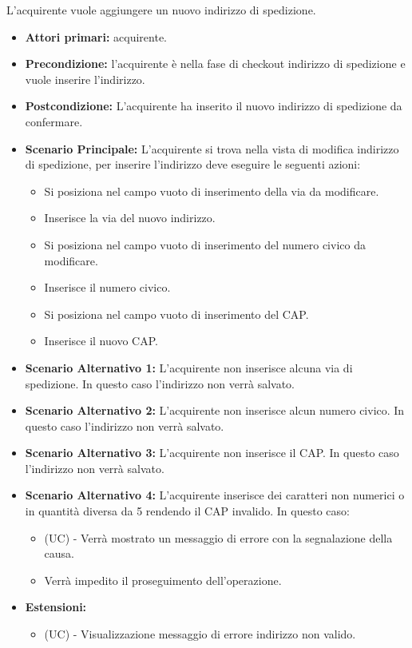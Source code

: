 L'acquirente vuole aggiungere un nuovo indirizzo di spedizione.
\begin{itemize}
    \item \textbf{Attori primari:} acquirente.
    \item \textbf{Precondizione:} l'acquirente è nella fase di checkout indirizzo di spedizione e vuole inserire l'indirizzo.
    \item \textbf{Postcondizione:} L'acquirente ha inserito il nuovo indirizzo di spedizione da confermare.
    \item \textbf{Scenario Principale:} L'acquirente si trova nella vista di modifica indirizzo di spedizione, per inserire l'indirizzo deve eseguire le seguenti azioni:
        \begin{itemize}
            \item Si posiziona nel campo vuoto di inserimento della via da modificare.
            \item Inserisce la via del nuovo indirizzo.
            \item Si posiziona nel campo vuoto di inserimento del numero civico da modificare.
            \item Inserisce il numero civico.
            \item Si posiziona nel campo vuoto di inserimento del CAP.
            \item Inserisce il nuovo CAP.
        \end{itemize}
    \item \textbf{Scenario Alternativo 1:} L'acquirente non inserisce alcuna via di spedizione. In questo caso l'indirizzo non verrà salvato.
    \item \textbf{Scenario Alternativo 2:} L'acquirente non inserisce alcun numero civico. In questo caso l'indirizzo non verrà salvato.
    \item \textbf{Scenario Alternativo 3:} L'acquirente non inserisce il CAP. In questo caso l'indirizzo non verrà salvato.
    \item \textbf{Scenario Alternativo 4:} L'acquirente inserisce dei caratteri non numerici o in quantità diversa da 5 rendendo il CAP invalido. In questo caso:
    \begin{itemize}
        \item (UC) - Verrà mostrato un messaggio di errore con la segnalazione della causa.
        \item Verrà impedito il proseguimento dell'operazione.
    \end{itemize}
    \item \textbf{Estensioni:}
    \begin{itemize}
        \item (UC) - Visualizzazione messaggio di errore  indirizzo non valido.
    \end{itemize}
\end{itemize}

